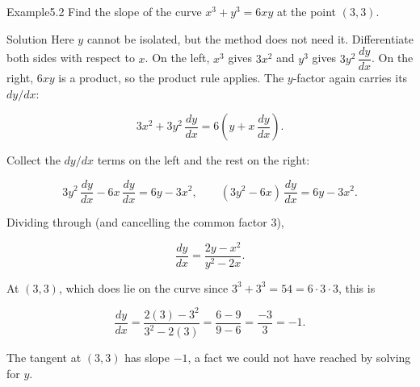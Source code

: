 \documentclass[a4paper,12pt,oneside]{memoir}
\begin{document}
\begin{workedexample}
\begin{envexample}{Example}{5.2}{}
Find the slope of the curve \(x^{3} + y^{3} = 6xy\) at the point \((3, 3)\).
\end{envexample}
\begin{envsolution}{Solution}{}{}
Here \(y\) cannot be isolated, but the method does not need it. Differentiate both sides with respect to \(x\). On the left, \(x^{3}\) gives \(3x^{2}\) and \(y^{3}\) gives \(3y^{2}\,\dfrac{dy}{dx}\). On the right, \(6xy\) is a product, so the product rule applies. The \(y\)-factor again carries its \(dy/dx\):

\[ 3x^{2} + 3y^{2}\,\frac{dy}{dx} = 6\!\left(y + x\,\frac{dy}{dx}\right). \]

Collect the \(dy/dx\) terms on the left and the rest on the right:

\[ 3y^{2}\,\frac{dy}{dx} - 6x\,\frac{dy}{dx} = 6y - 3x^{2}, \qquad (3y^{2} - 6x)\,\frac{dy}{dx} = 6y - 3x^{2}. \]

Dividing through (and cancelling the common factor \(3\)),

\[ \frac{dy}{dx} = \frac{2y - x^{2}}{y^{2} - 2x}. \]

At \((3, 3)\), which does lie on the curve since \(3^{3} + 3^{3} = 54 = 6\cdot 3\cdot 3\), this is

\[ \frac{dy}{dx} = \frac{2(3) - 3^{2}}{3^{2} - 2(3)} = \frac{6 - 9}{9 - 6} = \frac{-3}{3} = -1. \]

The tangent at \((3, 3)\) has slope \(-1\), a fact we could not have reached by solving for \(y\). \qedmark
\end{envsolution}
\end{workedexample}
\end{document}
